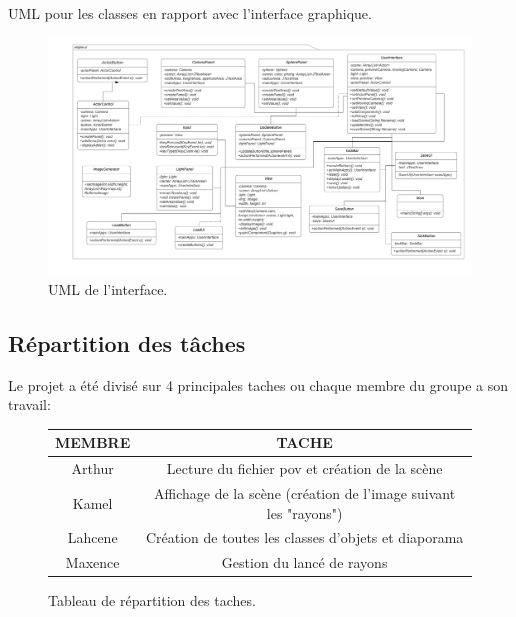 \documentclass[12pt]{article}
\begin{document}
			\paragraph{}UML pour les classes en rapport avec l'interface graphique.
			    \begin{figure}[h]
                    \begin{center}
                    \includegraphics[width=1.1\textwidth]{./images/Interface.png}
                    \end{center}
                    \caption{UML de l'interface.}
                    \label{fig}
                \end{figure}
		\subsection{Répartition des tâches}
		Le projet a été divisé sur 4 principales taches ou chaque membre du groupe a son travail:
		\begin{figure}[h]
        	\begin{center}
            	\begin{tabular}{|c|c|}
			\hline
			\textbf{MEMBRE} & \textbf{TACHE}\\
  			\hline
 			Arthur & Lecture du fichier pov et création de la scène\\
  			\hline
  			Kamel & Affichage de la scène (création de l'image suivant les "rayons")\\
  			\hline
  			Lahcene & Création de toutes les classes d'objets et diaporama\\
  			\hline
  			Maxence & Gestion du lancé de rayons\\
  			\hline
		\end{tabular}
        \end{center}
        \caption{Tableau de répartition des taches.}
        \label{fig}
        \end{figure}
\end{document}
